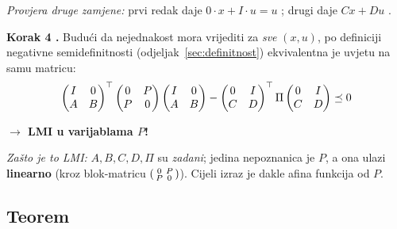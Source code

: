 \emph{Provjera druge zamjene:} prvi redak daje
$0\cdot x + I\cdot u = u$ \checkmark; drugi daje $Cx + Du$ \checkmark.

\textbf{Korak 4 .} Budući da nejednakost mora vrijediti za
\emph{sve} $(x,u)$, po definiciji negativne semidefinitnosti
(odjeljak~\ref{sec:definitnost}) ekvivalentna je uvjetu na samu matricu:
\begin{equation}
\label{eq:disip-lmi}
\begin{pmatrix}I & 0\\ A & B\end{pmatrix}^{\top}
\begin{pmatrix}0 & P\\ P & 0\end{pmatrix}
\begin{pmatrix}I & 0\\ A & B\end{pmatrix}
- \begin{pmatrix}0 & I\\ C & D\end{pmatrix}^{\top}\Pi
\begin{pmatrix}0 & I\\ C & D\end{pmatrix} \preceq 0
\end{equation}

\textbf{$\to$ LMI u varijablama $P$!}

\emph{Zašto je to LMI:} $A, B, C, D, \Pi$ su \emph{zadani}; jedina nepoznanica
je $P$, a ona ulazi \textbf{linearno} (kroz blok-matricu
$\begin{psmallmatrix}0&P\\P&0\end{psmallmatrix}$). Cijeli izraz je dakle afina
funkcija od $P$. \checkmark

\subsection{Teorem}

